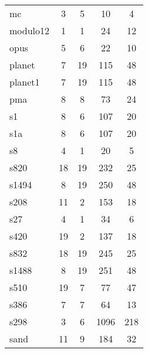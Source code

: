 {\begin{pespace}
\begin{center}
\begin{tabular}{|l|c|c|c|c|}
mc         &         3   &      5     &     10     &      4\\
modulo12   &         1   &      1     &     24     &     12\\
opus       &         5   &      6     &     22     &     10\\
planet     &         7   &     19     &    115     &     48\\
planet1    &         7   &     19     &    115     &     48\\
pma        &         8   &      8     &     73     &     24\\
s1         &         8   &      6     &    107     &     20\\
s1a        &         8   &      6     &    107     &     20\\
s8         &         4   &      1     &     20     &      5\\
s820       &        18   &     19     &    232     &     25\\
s1494      &         8   &     19     &    250     &     48\\
s208       &        11   &      2     &    153     &     18\\
s27        &         4   &      1     &     34     &      6\\
s420       &        19   &      2     &    137     &     18\\
s832       &        18   &     19     &    245     &     25\\
s1488      &         8   &     19     &    251     &     48\\
s510       &        19   &      7     &     77     &     47\\
s386       &         7   &      7     &     64     &     13\\
s298       &         3   &      6     &   1096     &    218\\
sand       &        11   &      9     &    184     &     32\\
\hline
\end{tabular}
\end{center}


\vspace*{.2cm}


\end{pespace}}
